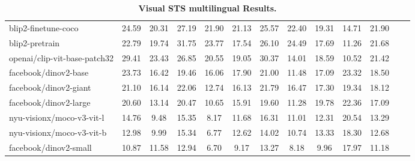 \begin{table*}
{\begin{tabular}{lcccccccccccc}
blip2-finetune-coco &24.59 &20.31 &27.19 &21.90 &21.13 &25.57 &22.40 &19.31 &14.71 &21.90 \\
blip2-pretrain &22.79 &19.74 &31.75 &23.77 &17.54 &26.10 &24.49 &17.69 &11.26 &21.68 \\
openai/clip-vit-base-patch32 &29.41 &23.43 &26.85 &20.55 &19.05 &30.37 &14.01 &18.59 &10.52 &21.42 \\
facebook/dinov2-base &23.73 &16.42 &19.46 &16.06 &17.90 &21.00 &11.48 &17.09 &23.32 &18.50 \\
facebook/dinov2-giant &21.10 &16.14 &22.06 &12.74 &16.13 &21.79 &16.47 &17.30 &19.34 &18.12 \\
facebook/dinov2-large &20.60 &13.14 &20.47 &10.65 &15.91 &19.60 &11.28 &19.78 &22.36 &17.09 \\
nyu-visionx/moco-v3-vit-l &14.76 &9.48 &15.35 &8.17 &11.68 &16.31 &11.01 &12.31 &20.54 &13.29 \\
nyu-visionx/moco-v3-vit-b &12.98 &9.99 &15.34 &6.77 &12.62 &14.02 &10.74 &13.33 &18.30 &12.68 \\
facebook/dinov2-small &10.87 &11.58 &12.94 &6.70 &9.17 &13.27 &8.18 &9.96 &17.97 &11.18 \\
\bottomrule
\end{tabular}}
\caption{\textbf{Visual STS multilingual Results.}}
\label{tab: sts multi}
\end{table*}